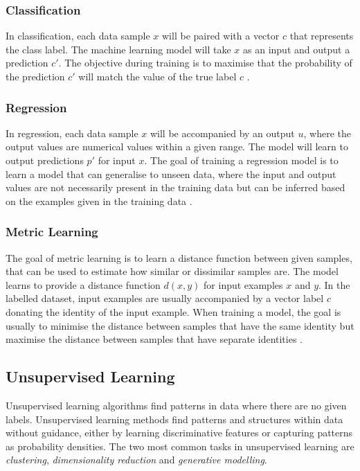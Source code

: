 \subsubsection{Classification}

In classification, each data sample $x$ will be paired with a vector $c$ that represents the class label. 
The machine learning model will take $x$ as an input and output a prediction $c'$. 
The objective during training is to maximise that the probability of the prediction $c'$ will match the value of the true label $c$ \citep{murphy2012machine}. 

\subsubsection{Regression}

In regression, each data sample $x$ will be accompanied by an output $u$, where the output values are numerical values within a given range. 
The model will learn to output predictions $p'$ for input $x$. The goal of training a regression model is to learn a model that can generalise to unseen data, where the input and output values are not necessarily present in the training data but can be inferred based on the examples given in the training data \citep{murphy2012machine}. 

\subsubsection{Metric Learning}
\label{c2:subsubsec:metric}

The goal of metric learning is to learn a distance function between given samples, that can be used to estimate how similar or dissimilar samples are. 
The model learns to provide a distance function $d(x,y)$ for input examples $x$ and $y$. In the labelled dataset, input examples are usually accompanied by a vector label $c$ donating the identity of the input example. 
When training a model, the goal is usually to minimise the distance between samples that have the same identity but maximise the distance between samples that have separate identities \citep{kulis2013metric}.

\subsection{Unsupervised Learning}

Unsupervised learning algorithms find patterns in data where there are no given labels. 
Unsupervised learning methods find patterns and structures within data without guidance, either by learning discriminative features or capturing patterns as probability densities. 
The two most common tasks in unsupervised learning are \textit{clustering}, \textit{dimensionality reduction} and \textit{generative modelling}.

